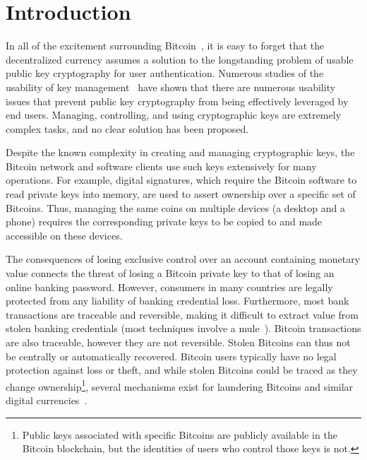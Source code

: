 

\section{Introduction}
In all of the excitement surrounding Bitcoin~\cite{Nak08}, it is easy to forget that the decentralized currency assumes a solution to the longstanding problem of usable public key cryptography for user authentication. Numerous studies of the usability of key management~\cite{} have shown that there are numerous usability issues that prevent public key cryptography from being effectively leveraged by end users. Managing, controlling, and using cryptographic keys are extremely complex tasks, and no clear solution has been proposed.  

Despite the known complexity in creating and managing cryptographic keys, the Bitcoin network and software clients use such keys extensively for many operations. For example, digital signatures, which require the Bitcoin software to read private keys into memory, are used to assert ownership over a specific set of Bitcoins. Thus, managing the same coins on multiple devices (\eg a desktop and a phone) requires the corresponding private keys to be copied to and made accessible on these devices. 


The consequences of losing exclusive control over an account containing monetary value connects the threat of losing a Bitcoin private key to that of losing an online banking password. However, consumers in many countries are legally protected from any liability of banking credential loss. Furthermore, most bank transactions are traceable and reversible, making it difficult to extract value from stolen banking credentials (most techniques involve a mule~\cite{FH12}). Bitcoin transactions are also traceable, however they are not reversible. Stolen Bitcoins can thus not be centrally or automatically recovered. Bitcoin users typically have no legal protection against loss or theft, and while stolen Bitcoins could be traced as they change ownership\footnote{Public keys associated with specific Bitcoins are publicly available in the Bitcoin blockchain, but the identities of users who control those keys is not.}, several mechanisms exist for laundering Bitcoins and similar digital currencies~\cite{MGGR13,BNMC+14}.

